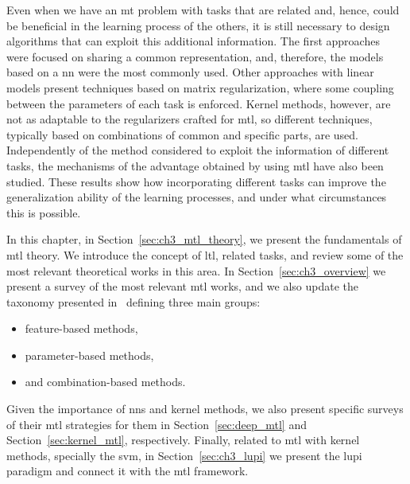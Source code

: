 Even when we have an \acrshort{mt} problem with tasks that are related and, hence, could be beneficial in the learning process of the others, it is still necessary to design algorithms that can exploit this additional information. 
The first approaches~\citep{Caruana97} were focused on sharing a common representation, and, therefore, the models based on a \acrfull{nn} were the most commonly used. Other approaches with linear models present techniques based on matrix regularization, where some coupling between the parameters of each task is enforced. Kernel methods, however, are not as adaptable to the regularizers crafted for \acrshort{mtl}, so different techniques, typically based on combinations of common and specific parts, are used.
Independently of the method considered to exploit the information of different tasks, the mechanisms of the advantage obtained by using \acrfull{mtl} have also been studied. These results show how incorporating different tasks can improve the generalization ability of the learning processes, and under what circumstances this is possible.

In this chapter, in Section~\ref{sec:ch3_mtl_theory}, we present the fundamentals of \acrshort{mtl} theory. We introduce the concept of \acrfull{ltl}, related tasks, and review some of the most relevant theoretical works in this area. 
%
In Section~\ref{sec:ch3_overview} we present a survey of the most relevant \acrshort{mtl} works, and we also update the taxonomy presented in~\cite{ZhangY17aa} defining three main groups: 
\begin{itemize}
    \item feature-based methods,
    \item parameter-based methods,
    \item and combination-based methods.
\end{itemize}
Given the importance of \acrfull{nns} and kernel methods, we also present specific surveys of their \acrshort{mtl} strategies for them in Section~\ref{sec:deep_mtl} and Section~\ref{sec:kernel_mtl}, respectively.
Finally, related to \acrshort{mtl} with kernel methods, specially the \acrfull{svm}, in Section~\ref{sec:ch3_lupi} we present the \acrfull{lupi} paradigm and connect it with the \acrshort{mtl} framework.
%







